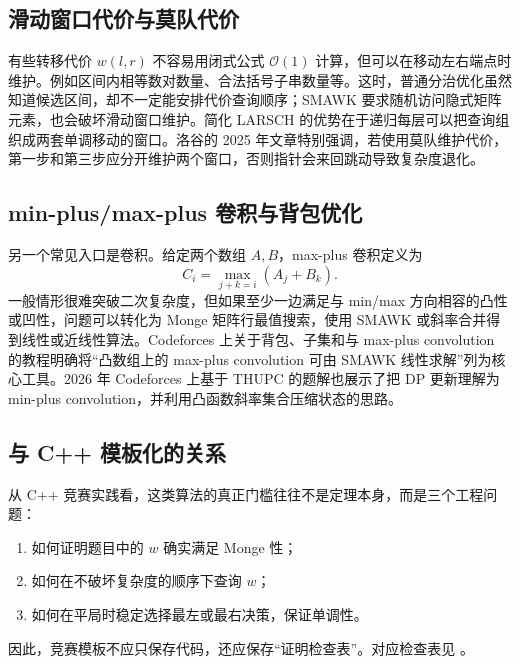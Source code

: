 \documentclass[lang=cn,a4paper,newtx,code=minted,bibtex]{elegantpaper}
\newcommand{\BigO}{\mathcal{O}}
\begin{document}
\subsection{滑动窗口代价与莫队代价}

有些转移代价 $w(l,r)$ 不容易用闭式公式 $\BigO(1)$ 计算，但可以在移动左右端点时维护。例如区间内相等数对数量、合法括号子串数量等。这时，普通分治优化虽然知道候选区间，却不一定能安排代价查询顺序；SMAWK 要求随机访问隐式矩阵元素，也会破坏滑动窗口维护。简化 LARSCH 的优势在于递归每层可以把查询组织成两套单调移动的窗口。洛谷的 2025 年文章特别强调，若使用莫队维护代价，第一步和第三步应分开维护两个窗口，否则指针会来回跳动导致复杂度退化\cite{luogu2025larsch}。

\subsection{min-plus/max-plus 卷积与背包优化}

另一个常见入口是卷积。给定两个数组 $A,B$，max-plus 卷积定义为
\[
  C_i=\max_{j+k=i}(A_j+B_k).
\]
一般情形很难突破二次复杂度，但如果至少一边满足与 min/max 方向相容的凸性或凹性，问题可以转化为 Monge 矩阵行最值搜索，使用 SMAWK 或斜率合并得到线性或近线性算法。Codeforces 上关于背包、子集和与 max-plus convolution 的教程明确将“凸数组上的 max-plus convolution 可由 SMAWK 线性求解”列为核心工具\cite{codeforces2022knapsack}。2026 年 Codeforces 上基于 THUPC 的题解也展示了把 DP 更新理解为 min-plus convolution，并利用凸函数斜率集合压缩状态的思路\cite{codeforces2026thupc}。

\subsection{与 C++ 模板化的关系}

从 C++ 竞赛实践看，这类算法的真正门槛往往不是定理本身，而是三个工程问题：
\begin{enumerate}[(1)]
  \item 如何证明题目中的 $w$ 确实满足 Monge 性；
  \item 如何在不破坏复杂度的顺序下查询 $w$；
  \item 如何在平局时稳定选择最左或最右决策，保证单调性。
\end{enumerate}
因此，竞赛模板不应只保存代码，还应保存“证明检查表”。对应检查表见 。
\end{document}
